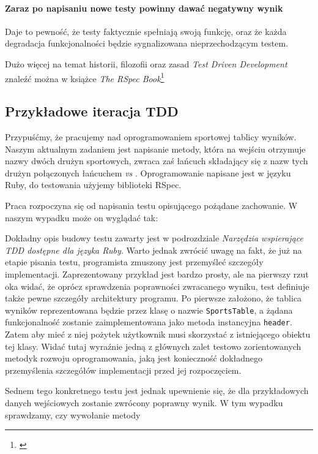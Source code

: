     \paragraph{Zaraz po napisaniu nowe testy powinny dawać negatywny wynik}
      Daje to pewność, że testy faktycznie spełniają swoją funkcję, oraz że każda degradacja funkcjonalności będzie sygnalizowana nieprzechodzącym testem.
      
      Dużo więcej na temat historii, filozofii oraz zasad \emph{Test Driven Development} znaleźć można w książce \emph{The RSpec Book}\footnote{\cite{rspec_book}}
      
  \subsection{Przykładowe iteracja TDD}
    Przypuśćmy, że pracujemy nad oprogramowaniem sportowej tablicy wyników. Naszym aktualnym zadaniem jest napisanie metody, która na wejściu otrzymuje nazwy dwóch drużyn sportowych, zwraca zaś łańcuch składający się z nazw tych drużyn połączonych łańcuchem \emph{ vs }. Oprogramowanie napisane jest w języku Ruby, do testowania użyjemy biblioteki RSpec.
    
    Praca rozpoczyna się od napisania testu opisującego pożądane zachowanie. W naszym wypadku może on wyglądać tak: 
    
    

    Dokładny opis budowy testu zawarty jest w podrozdziale \emph{Narzędzia wspierające TDD dostępne dla języka Ruby}. Warto jednak zwrócić uwagę na fakt, że już na etapie pisania testu, programista zmuszony jest przemyśleć szczegóły implementacji. Zaprezentowany przykład jest bardzo prosty, ale na pierwszy rzut oka widać, że oprócz sprawdzenia poprawności zwracanego wyniku, test definiuje także pewne szczegóły architektury programu. Po pierwsze założono, że tablica wyników reprezentowana będzie przez klasę o nazwie \texttt{SportsTable}, a żądana funkcjonalność zostanie zaimplementowana jako metoda instancyjna \texttt{header}. Zatem aby mieć z niej pożytek użytkownik musi skorzystać z istniejącego obiektu tej klasy. Widać tutaj wyraźnie jedną z głównych zalet testowo zorientowanych metodyk rozwoju oprogramowania, jaką jest konieczność dokładnego przemyślenia szczegółów implementacji przed jej rozpoczęciem.
    
    Sednem tego konkretnego testu jest jednak upewnienie się, że dla przykładowych danych wejściowych zostanie zwrócony poprawny wynik. W tym wypadku sprawdzamy, czy wywołanie metody 
    
